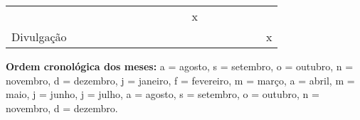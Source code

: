 \begin{table}[h]
{\begin{tabular}{ l l l l l l l l l l l l l l l l l l }
    \multicolumn{1}{c|}{ } &
    \multicolumn{1}{c|}{ } &
    \multicolumn{1}{c|}{ } &
    \multicolumn{1}{c|}{ } &
    \multicolumn{1}{c|}{ } &
    \multicolumn{1}{c|}{ } &
    \multicolumn{1}{c|}{ } &
    \multicolumn{1}{c|}{ } &
    \multicolumn{1}{c|}{ } &
    \multicolumn{1}{c|}{ } &
    \multicolumn{1}{c|}{ } &
    \multicolumn{1}{c|}{x}
  \\  
  \cline{1-1}\cline{2-2}\cline{3-3}\cline{4-4}\cline{5-5}\cline{6-6}\cline{7-7}\cline{8-8}\cline{9-9}\cline{10-10}\cline{11-11}\cline{12-12}\cline{13-13}\cline{14-14}\cline{15-15}\cline{16-16}\cline{17-17}\cline{18-18}  
    \multicolumn{1}{|c|}{Divulgação} &
    \multicolumn{1}{c|}{ } &
    \multicolumn{1}{c|}{ } &
    \multicolumn{1}{c|}{ } &
    \multicolumn{1}{c|}{ } &
    \multicolumn{1}{c|}{ } &
    \multicolumn{1}{c|}{ } &
    \multicolumn{1}{c|}{ } &
    \multicolumn{1}{c|}{ } &
    \multicolumn{1}{c|}{ } &
    \multicolumn{1}{c|}{ } &
    \multicolumn{1}{c|}{ } &
    \multicolumn{1}{c|}{ } &
    \multicolumn{1}{c|}{ } &
    \multicolumn{1}{c|}{ } &
    \multicolumn{1}{c|}{ } &
    \multicolumn{1}{c|}{ } &
    \multicolumn{1}{c|}{x}
  \\  
  \hline

 \end{tabular} }
\end{table}


\textbf{Ordem cronológica dos meses: }a = agosto, s = setembro, o = outubro, n = novembro, d = dezembro, j = janeiro, f = fevereiro, m = março, a = abril, m = maio, j = junho, j = julho, a = agosto, s = setembro, o = outubro, n = novembro, d = dezembro. 